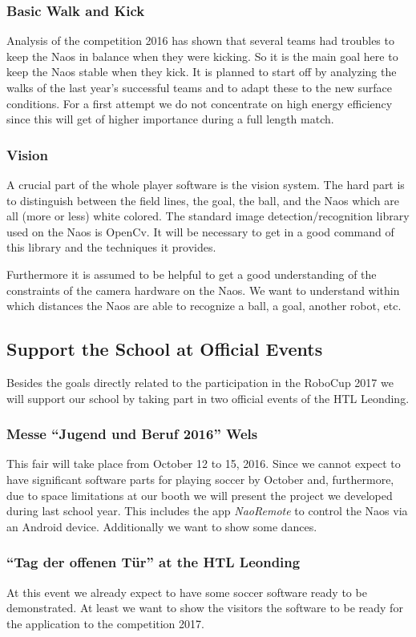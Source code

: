 \documentclass[12pt]{article}
\theoremstyle{definition}
\begin{document}
\subsubsection{Basic Walk and Kick}
Analysis of the competition 2016 has shown that several teams had troubles to keep the Naos in balance when they were kicking. So it is the main goal here to keep the Naos stable when they kick. It is planned to start off by analyzing the walks of the last year's successful teams and to adapt these to the new surface conditions. For a first attempt we do not concentrate on high energy efficiency since this will get of higher importance during a full length match.

\subsubsection{Vision}
A crucial part of the whole player software is the vision system. The hard part is to distinguish between the field lines, the goal, the ball, and the Naos which are all (more or less) white colored. The standard image detection/recognition library used on the Naos is OpenCv. It will be necessary to get in a good command of this library and the techniques it provides.

Furthermore it is assumed to be helpful to get a good understanding of the constraints of the camera hardware on the Naos. We want to understand within which distances the Naos are able to recognize a ball, a goal, another robot, etc.

\subsection{Support the School at Official Events}
Besides the goals directly related to the participation in the RoboCup 2017 we will support our school by taking part in two official events of the HTL Leonding.
\subsubsection{Messe ``Jugend und Beruf 2016'' Wels}
This fair will take place from October 12 to 15, 2016. Since we cannot expect to have significant software parts for playing soccer by October and, furthermore, due to space limitations at our booth we will present the project we developed during last school year. This includes the app {\em NaoRemote} to control the Naos via an Android device. Additionally we want to show some dances.

\subsubsection{``Tag der offenen Tür'' at the HTL Leonding}
At this event we already expect to have some soccer software ready to be demonstrated. At least we want to show the visitors the software to be ready for the application to the competition 2017. 
\end{document}
